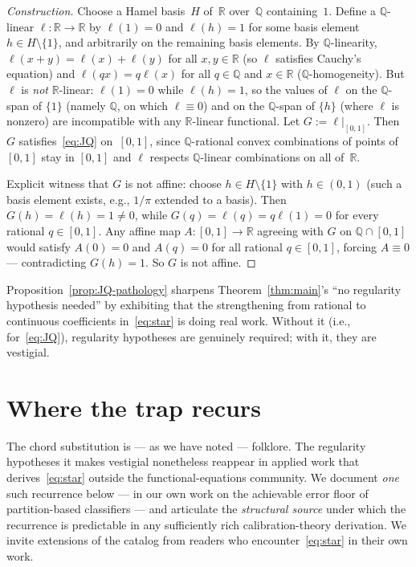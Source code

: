 \documentclass[11pt,a4paper]{amsart}
\newcommand{\R}{\mathbb R}
\newcommand{\Q}{\mathbb Q}
\begin{document}
\begin{proof}[Construction]
Choose a Hamel basis~$H$ of~$\R$ over~$\Q$ containing~$1$. Define a
$\Q$-linear $\ell\colon\R\to\R$ by $\ell(1)=0$ and $\ell(h)=1$ for some
basis element $h\in H\setminus\{1\}$, and arbitrarily on the remaining
basis elements. By $\Q$-linearity, $\ell(x+y)=\ell(x)+\ell(y)$ for all
$x,y\in\R$ (so $\ell$ satisfies Cauchy's equation) and $\ell(qx)=q\ell(x)$
for all $q\in\Q$ and $x\in\R$ ($\Q$-homogeneity). But $\ell$ is \emph{not}
$\R$-linear: $\ell(1)=0$ while $\ell(h)=1$, so the values of $\ell$ on the
$\Q$-span of $\{1\}$ (namely $\Q$, on which $\ell\equiv 0$) and on the
$\Q$-span of $\{h\}$ (where $\ell$ is nonzero) are incompatible with any
$\R$-linear functional. Let $G := \ell|_{[0,1]}$. Then $G$
satisfies~\eqref{eq:JQ} on~$[0,1]$, since $\Q$-rational convex combinations
of points of $[0,1]$ stay in $[0,1]$ and $\ell$ respects $\Q$-linear
combinations on all of~$\R$.

Explicit witness that $G$ is not affine: choose $h\in H\setminus\{1\}$ with
$h\in(0,1)$ (such a basis element exists, e.g., $1/\pi$ extended to a
basis). Then $G(h)=\ell(h)=1\neq 0$, while $G(q)=\ell(q)=q\ell(1)=0$ for
every rational $q\in[0,1]$. Any affine map $A\colon[0,1]\to\R$ agreeing
with $G$ on $\Q\cap[0,1]$ would satisfy $A(0)=0$ and $A(q)=0$ for all
rational $q\in[0,1]$, forcing $A\equiv 0$ --- contradicting $G(h)=1$. So
$G$ is not affine.
\end{proof}

Proposition~\ref{prop:JQ-pathology} sharpens Theorem~\ref{thm:main}'s ``no
regularity hypothesis needed'' by exhibiting that the strengthening from
rational to continuous coefficients in~\eqref{eq:star} is doing real work.
Without it (i.e., for~\eqref{eq:JQ}), regularity hypotheses are genuinely
required; with it, they are vestigial.

\section{Where the trap recurs}
\label{sec:recurrence}

The chord substitution is --- as we have noted --- folklore. The regularity
hypotheses it makes vestigial nonetheless reappear in applied work that
derives~\eqref{eq:star} outside the functional-equations community. We
document \emph{one} such recurrence below --- in our own work on the
achievable error floor of partition-based classifiers --- and articulate
the \emph{structural source} under which the recurrence is predictable in
any sufficiently rich calibration-theory derivation. We invite extensions
of the catalog from readers who encounter~\eqref{eq:star} in their own work.
\end{document}
